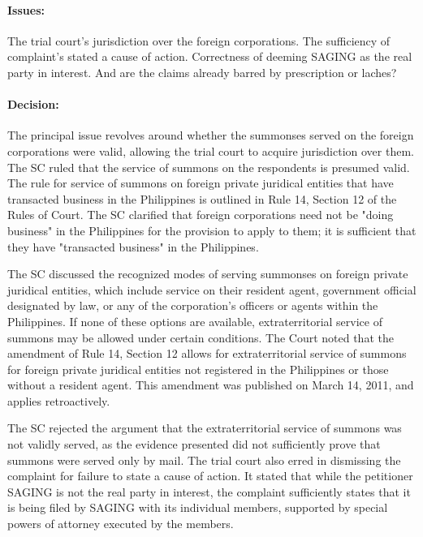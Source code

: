 \documentclass[
12pt,
oneside,
onehalfspacing,
headsepline
]{DigestCollection}
\begin{document}
\paragraph{Issues:}


The trial court's jurisdiction over the foreign corporations. The sufficiency of complaint's stated a cause of action. Correctness of deeming SAGING as the real party in interest. And are the claims already barred by prescription or laches?

\paragraph{Decision:}

The principal issue revolves around whether the summonses served on the foreign corporations were valid, allowing the trial court to acquire jurisdiction over them. The SC ruled that the service of summons on the respondents is presumed valid. The rule for service of summons on foreign private juridical entities that have transacted business in the Philippines is outlined in Rule 14, Section 12 of the Rules of Court. The SC clarified that foreign corporations need not be "doing business" in the Philippines for the provision to apply to them; it is sufficient that they have "transacted business" in the Philippines.

The SC discussed the recognized modes of serving summonses on foreign private juridical entities, which include service on their resident agent, government official designated by law, or any of the corporation's officers or agents within the Philippines. If none of these options are available, extraterritorial service of summons may be allowed under certain conditions. The Court noted that the amendment of Rule 14, Section 12 allows for extraterritorial service of summons for foreign private juridical entities not registered in the Philippines or those without a resident agent. This amendment was published on March 14, 2011, and applies retroactively.

The SC rejected the argument that the extraterritorial service of summons was not validly served, as the evidence presented did not sufficiently prove that summons were served only by mail. The trial court also erred in dismissing the complaint for failure to state a cause of action. It stated that while the petitioner SAGING is not the real party in interest, the complaint sufficiently states that it is being filed by SAGING with its individual members, supported by special powers of attorney executed by the members.
\end{document}
